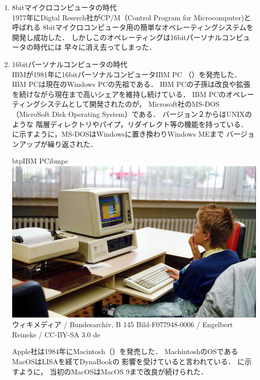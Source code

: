 \begin{enumerate}
\item 8bitマイクロコンピュータの時代 \\
1977年にDigtal Reserch社がCP/M（Control Program for Microcomputer)と呼ばれる
8bitマイクロコンピュータ用の簡単なオペレーティングシステムを
開発し成功した．
しかしこのオペレーティングは16bitパーソナルコンピュータの時代には
早々に消え去ってしまった\cite{fourth}．

\item 16bitパーソナルコンピュータの時代 \\
IBMが1981年に16bitパーソナルコンピュータIBM PC\cite{ibmpc81}
（）を発売した．
IBM PCは現在のWindows PCの先祖である．
IBM PCの子孫は改良や拡張を続けながら現在まで高いシェアを維持し続けている．
IBM PCのオペレーティングシステムとして開発されたのが，
Microsoft社のMS-DOS（MicroSoft Disk Operating System）\cite{msdos}である．
バージョン２からはUNIXのような
階層ディレクトリやパイプ，リダイレクト等の機能を持っている．
に示すように，MS-DOSはWindowsに置き換わりWindows MEまで
バージョンアップが繰り返された．

\begin{myfig}{btp}{IBM PC}{ibmpc}
\includegraphics[scale=0.35]
{Photo/Bundesarchiv_B_145_Bild-F077948-0006,_Jugend-Computerschule_mit_IBM-PC.jpg}\\
{\small
ウィキメディア /
Bundesarchiv, B 145 Bild-F077948-0006 / Engelbert Reineke / CC-BY-SA 3.0 de}
\end{myfig}

Apple社は1984年にMacintosh（）を発売した．
MachintoshのOSであるMacOSはLISAを経てDynaBook\cite{key72, key72J}の
影響を受けていると言われている\cite{fourth}．
に示すように，
当初のMacOSはMacOS 9\cite{classicmacos}まで改良が続けられた．


\end{enumerate}
